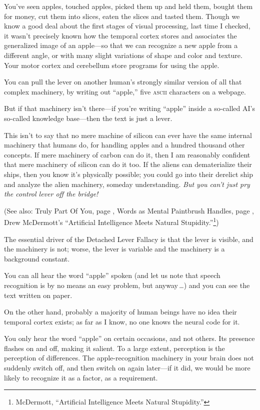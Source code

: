  You've seen apples, touched apples, picked them up
and held them, bought them for money, cut them into slices, eaten the
slices and tasted them. Though we know a good deal about the first
stages of visual processing, last time I checked, it
wasn't precisely known how the temporal cortex stores
and associates the generalized image of an apple---so that we can
recognize a new apple from a different angle, or with many slight
variations of shape and color and texture. Your motor cortex and
cerebellum store programs for using the apple.


 You can pull the lever on another human's strongly
similar version of all that complex machinery, by writing out
``apple,'' five \textsc{ascii} characters on
a webpage.


 But if that machinery isn't there---if
you're writing
``apple'' inside a so-called
AI's so-called knowledge base---then the text is just a
lever.

{
 This isn't to say that no mere machine of silicon
can ever have the same internal machinery that humans do, for handling
apples and a hundred thousand other concepts. If mere machinery of
carbon can do it, then I am reasonably confident that mere machinery of
silicon can do it too. If the aliens can dematerialize their ships,
then you know it's physically possible; you could go
into their derelict ship and analyze the alien machinery, someday
understanding. \textit{But you can't just pry the
control lever off the bridge!}}

{
 (See also: Truly Part Of You, page \pageref{truly_part_of_you}, Words as Mental Paintbrush Handles, page \pageref{words_as_mental_paintbrush_handles},
Drew McDermott's ``Artificial
Intelligence Meets Natural
Stupidity.''\footnote{McDermott, ``Artificial Intelligence Meets
Natural Stupidity.''})}


 The essential driver of the Detached Lever Fallacy is that the
lever is visible, and the machinery is not; worse, the lever is
variable and the machinery is a background constant.


 You can all hear the word
``apple'' spoken (and let us note
that speech recognition is by no means an easy problem, but anyway\,\ldots) and you can see the text written on paper.


 On the other hand, probably a majority of human beings have no
idea their temporal cortex exists; as far as I know, no one knows the
neural code for it.


 You only hear the word
``apple'' on certain occasions, and
not others. Its presence flashes on and off, making it salient. To a
large extent, perception is the perception of differences. The
apple-recognition machinery in your brain does not suddenly switch off,
and then switch on again later---if it did, we would be more likely to
recognize it as a factor, as a requirement.


